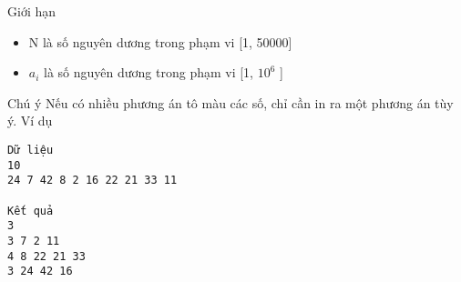 Giới hạn  
\begin{itemize}
	\item     N là số nguyên dương trong phạm vi [1, 50000]   
	\item     $a_{i}$    là số nguyên dương trong phạm vi [1, $10^{6}$    ]   
\end{itemize}
   Chú ý  
Nếu có nhiều phương án tô màu các số, chỉ cần in ra một phương án tùy ý.
   Ví dụ  
\begin{verbatim}
Dữ liệu
10
24 7 42 8 2 16 22 21 33 11	

Kết quả
3
3 7 2 11 
4 8 22 21 33 
3 24 42 16
\end{verbatim}